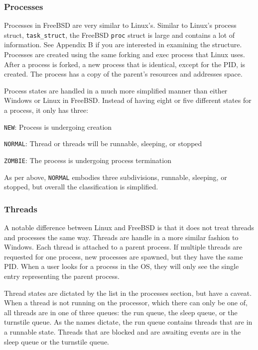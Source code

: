 \documentclass[10pt,letterpaper,onecolumn,draftclsnofoot]{IEEEtran}
\begin{document}
\subsubsection{Processes}
Processes in FreeBSD are very similar to Linux's. Similar to Linux's process
struct, \texttt{task\_struct}, the FreeBSD \texttt{proc} struct is large and
contains a lot of information. See Appendix B if you are interested in examining the structure. Processes are created using the same forking and
exec process that Linux uses. After a process is forked, a new process that is
identical, except for the PID, is created. The process has a copy of the parent's
resources and addresses space.

Process states are handled in a much more simplified manner than either Windows
or Linux in FreeBSD. Instead of having eight or five different states for a process,
it only has three:
\begin{description}
	\item \texttt{NEW}: Process is undergoing creation
	\item \texttt{NORMAL}: Thread or threads will be runnable, sleeping, or stopped
	\item \texttt{ZOMBIE}: The process is undergoing process termination
\end{description}

As per above, \texttt{NORMAL} embodies three subdivisions, runnable, sleeping,
or stopped, but overall the classification is simplified. \cite{kirkgeorgebsd}

\subsubsection{Threads}
A notable difference between Linux and FreeBSD is that it does not treat threads
and processes the same way. Threads are handle in a more similar fashion to Windows.
Each thread is attached to a parent process. If multiple threads are requested
for one process, new processes are spawned, but they have the same PID. When a
user looks for a process in the OS, they will only see the single entry representing
the parent process.

Thread states are dictated by the list in the processes section, but have a caveat.
When a thread is not running on the processor, which there can only be one of,
all threads are in one of three queues: the run queue, the sleep queue, or the
turnstile queue. As the names dictate, the run queue contains threads that are
in a runnable state. Threads that are blocked and are awaiting events are in the
sleep queue or the turnstile queue.
\end{document}
